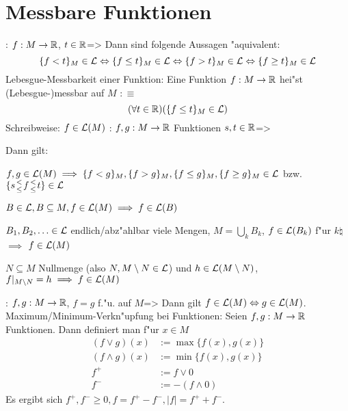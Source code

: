 \section{Messbare Funktionen}
\theorem:
  $f:M\to\mathbb R$, $t\in\mathbb R$=>{
  Dann sind folgende Aussagen "aquivalent: 
  \[\{f<t\}_M\in\mathcal{L} \Leftrightarrow 
    \{f\leq t\}_M\in\mathcal{L} \Leftrightarrow 
    \{f>t\}_M\in\mathcal{L} \Leftrightarrow 
    \{f\geq t\}_M\in\mathcal{L} 
    \]
  }
 Lebesgue-Messbarkeit einer Funktion:{
  Eine Funktion $f:M\to\mathbb R$ hei"st (Lebesgue-)messbar auf $M$ $:\equiv$
  \[(\forall t\in\mathbb R)(\{f\leq t\}_M\in\mathcal{L})
    \]
  Schreibweise: $f\in\mathcal{L}(M)$
}
\theorem:
  $f,g:M\to\mathbb R$ Funktionen $s,t\in\mathbb R$=>{
  Dann gilt:
  \begin{stmts}
    \item $f,g\in\mathcal{L}(M) \implies 
      \{f < g\}_M,\{f > g\}_M,\{f \leq g\}_M,\{f \geq g\}_M \in\mathcal{L}$ bzw.
      $\{s\stack(<;\leq)f\stack(<;\leq) t\}\in\SetLMeas$
    \item $B\in\mathcal{L},B\subseteq M,f\in\mathcal{L}(M)\implies f\in\mathcal{L}(B)$
    \item $B_1,B_2,\ldots\in\mathcal{L}$ endlich/abz"ahlbar viele Mengen, 
      $M=\bigcup_k B_k$, $f\in\mathcal{L}(B_k)$ f"ur $k\natural$ $\implies$ 
      $f\in\mathcal{L}(M)$
    \item $N\subseteq M$ Nullmenge (also $N,M\setminus N\in\mathcal{L}$) und 
      $h\in\mathcal{L}(M\setminus N)$, $f|_{M\setminus N}=h\implies f\in\mathcal{L}(M)$
    \end{stmts}
  }
\theorem:
  $f,g:M\to\mathbb R$, $f=g$ f."u. auf $M$=>{
  Dann gilt $f\in\mathcal{L}(M)\Leftrightarrow g\in\mathcal{L}(M)$.
  }
 Maximum/Minimum-Verkn"upfung bei Funktionen:{
  Seien $f,g:M\to\mathbb R$ Funktionen. Dann definiert man f"ur $x\in M$
  \begin{align*}
    (f\lor g)(x)&:=\max\{f(x),g(x)\} \\
    (f\land g)(x)&:=\min\{f(x),g(x)\} \\
    f^+&:=f\lor 0 \\
    f^-&:=-(f\land 0)
    \end{align*}
  Es ergibt sich $f^+,f^-\geq 0,f=f^+-f^-,|f|=f^++f^-$.
  }
